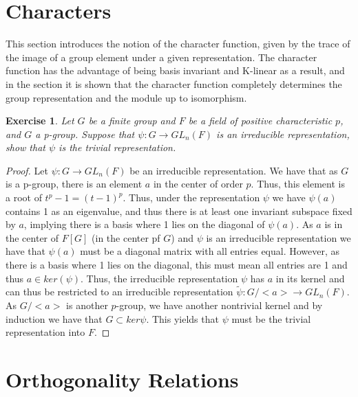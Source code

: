 \documentclass{article}
\newtheorem{exercise}{Exercise}[section]
\begin{document}
\section{Characters}

This section introduces the notion of the character function, given by the trace of the image of a group element under a given representation. The character function has the advantage of being basis invariant and K-linear as a result, and in the section it is shown that the character function completely determines the group representation and the module up to isomorphism.

\begin{exercise}
Let $G$ be a finite group and $F$ be a field of positive
characteristic $p$, and $G$ a p-group. Suppose that $\psi: G \to GL_{n}(F)$ is an
irreducible representation, show that $\psi$ is the trivial representation.
\end{exercise}

\begin{proof}

  Let $\psi: G \to GL_{n}(F)$ be an irreducible representation. We have that as $G$ is a p-group, there is an element $a$ in the center of order $p$. Thus, this element is a root of $t^{p} - 1 = (t - 1)^{p}$. Thus, under the representation $\psi$ we have $\psi(a)$ contains 1 as an eigenvalue, and thus there is at least one invariant subspace fixed by $a$, implying there is a basis where 1 lies on the diagonal of $\psi(a)$. As $a$ is in the center of $F[G]$ (in the center pf $G$) and $\psi$ is an irreducible representation we have that $\psi(a)$ must be a diagonal matrix with all entries equal. However, as there is a basis where 1 lies on the diagonal, this must mean all entries are 1 and thus  $a \in ker(\psi)$. Thus, the irreducible representation $\psi$ has $a$ in its kernel and can thus be restricted to an irreducible representation $\widetilde\psi: G/<a> \to GL_{n}(F)$. As $G/<a>$ is another $p$-group, we have another nontrivial kernel and by induction we have that $G \subset ker\psi$. This yields that $\psi$ must be the trivial representation into $F$. 
  \end{proof}


\pagebreak 

\section{Orthogonality Relations}
\end{document}
